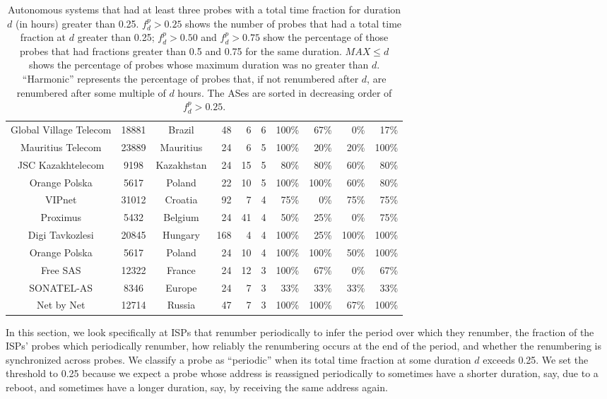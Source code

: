 \begin{table*}[t]
\begin{center}
\begin{tiny}
\begin{tabular}{ccc|r|rr|r<{\%}r<{\%}|r<{\%}r<{\%}}
Global Village Telecom & 18881&Brazil    &  48&      6&    6&    100&     67&      0&     17\\
Mauritius Telecom& 23889&Mauritius &  24&      6&    5&    100&     20&     20&    100\\
JSC Kazakhtelecom&  9198&Kazakhstan&  24&     15&    5&     80&     80&     60&     80\\
Orange Polska  &  5617&Poland    &  22&     10&    5&    100&    100&     60&     80\\
VIPnet         & 31012&Croatia   &  92&      7&    4&     75&      0&     75&     75\\
Proximus       &  5432&Belgium   &  24&     41&    4&     50&     25&      0&     75\\
Digi Tavkozlesi& 20845&Hungary   & 168&      4&    4&    100&     25&    100&    100\\
Orange Polska  &  5617&Poland    &  24&     10&    4&    100&    100&     50&    100\\
Free SAS       & 12322&France    &  24&     12&    3&    100&     67&      0&     67\\
SONATEL-AS     &  8346&Europe    &  24&      7&    3&     33&     33&     33&     33\\
Net by Net     & 12714&Russia    &  47&      7&    3&    100&    100&     67&    100\\
   \end{tabular}
  \end{tiny}
  \end{center}
  \caption{\label{tbl:periodic_asns} Autonomous
    systems that had at least three probes with a total time fraction
    for duration $d$ (in hours) greater than 0.25. $f^p_d > 0.25$ shows
    the number of probes that had a total time fraction at $d$ greater than 0.25;
    $f^p_d > 0.50$ and $f^p_d > 0.75$ show the percentage of those probes
    that had fractions greater than 0.5 and 0.75 for the same duration.
    $MAX \leq d$ shows the percentage of probes whose maximum duration was no greater than
    $d$. ``Harmonic'' represents the percentage of probes that, if not renumbered after $d$, are renumbered after some multiple of $d$ hours.
    The ASes are sorted in decreasing order of $f^p_d > 0.25$.}
\end{table*}

In this section, we look specifically at ISPs that renumber
periodically to infer the period over which they renumber,
the fraction of the ISPs' probes which periodically renumber, how
reliably the renumbering occurs at the end of the period, and whether the
renumbering is synchronized across probes.  We classify a
probe as ``periodic'' when its total time fraction at
some duration $d$ exceeds 0.25.  We set the threshold to 0.25
because we expect a probe whose address is reassigned
periodically to sometimes have a shorter duration, say, due
to a reboot, and sometimes have a longer duration, say, by
receiving the same address again. 

